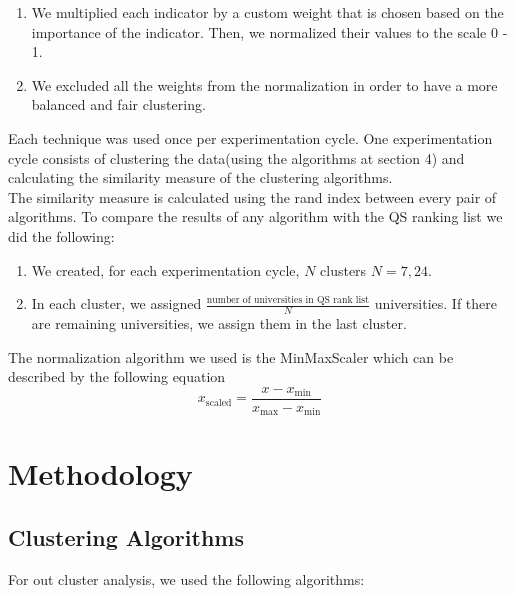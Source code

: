 \documentclass[conference]{IEEEtran}
\begin{document}
\begin{enumerate}
    \item We multiplied each indicator by a custom weight that is chosen based on the importance of the indicator. Then, we normalized their values to the scale 0 - 1. 
    \item We excluded all the weights from the normalization in order to have a more balanced and fair clustering. \\
\end{enumerate}

Each technique was used once per experimentation cycle. One experimentation cycle consists of clustering the data(using the algorithms at section 4) and calculating the similarity measure of the clustering algorithms. \\
The similarity measure is calculated using the rand index between every pair of algorithms. To compare the results of any algorithm with the QS ranking list we did the following: \\

\begin{enumerate}
    \item We created, for each experimentation cycle, \(N\) clusters \(N=7,24\). 
    \item In each cluster, we assigned \(\frac{\text{number of universities in QS rank list}}{N}\) universities. If there are remaining universities, we assign them in the last cluster. \\
\end{enumerate}

The normalization algorithm we used is the MinMaxScaler which can be described by the following equation \\

\begin{equation*}
    x_{\text{scaled}} = \frac{x - x_{\text{min}}}{x_{\text{max}} - x_{\text{min}}}
\end{equation*}


\section{Methodology}
\subsection{Clustering Algorithms}
For out cluster analysis, we used the following algorithms: \\
\end{document}
